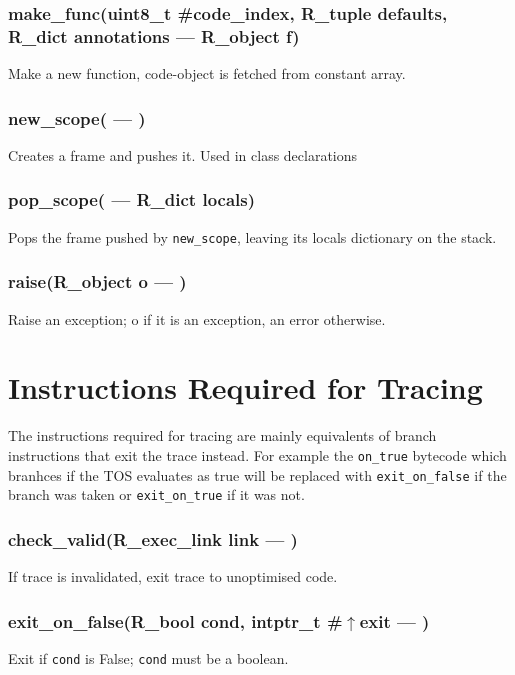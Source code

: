 \subsubsection{make\_func(uint8\_t \#code\_index, R\_tuple defaults, R\_dict annotations --- R\_object f)}
\vspace{-1em}Make a new function, code-object is fetched from constant array. \vspace{-1em}
\subsubsection{new\_scope( --- )}
\vspace{-1em}Creates a frame and pushes it. Used in class declarations \vspace{-1em}
\subsubsection{pop\_scope( --- R\_dict locals)}
\vspace{-1em}Pops the frame pushed by \texttt{new\_scope}, leaving its locals dictionary on the stack. \vspace{-1em}
\subsubsection{raise(R\_object o --- )}
\vspace{-1em}Raise an exception; o if it is an exception, an error otherwise. \vspace{-1em}
\section{Instructions Required for Tracing}

    The instructions required for tracing are mainly equivalents of 
    branch instructions that exit the trace instead.
    For example the \verb|on_true| bytecode which branhces if the TOS evaluates 
    as true will be replaced with \verb|exit_on_false| if the branch was taken
    or \verb|exit_on_true| if it was not.
    
\subsubsection{check\_valid(R\_exec\_link link --- )}
\vspace{-1em}If trace is invalidated, exit trace to unoptimised code. \vspace{-1em}
\subsubsection{exit\_on\_false(R\_bool cond, intptr\_t \#$\uparrow$exit --- )}
\vspace{-1em}Exit if \texttt{cond} is False; \texttt{cond} must be a boolean. \vspace{-1em}
